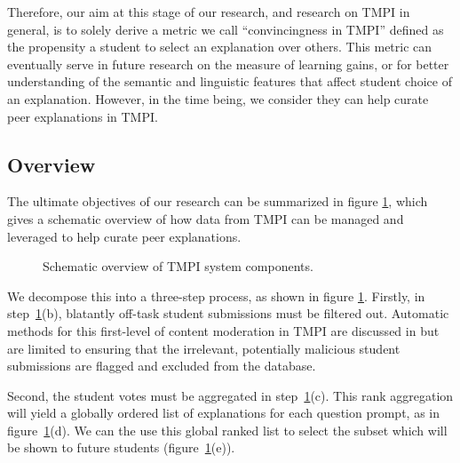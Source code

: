 \documentclass[notitlepage,12pt]{jedm}
\begin{document}
        Therefore, our aim at this stage of our research, and research on TMPI in general, is to solely derive a metric we call ``convincingness in TMPI'' defined as the propensity a student to select an explanation over others.  This metric can eventually serve in future research on the measure of learning gains, or for better understanding of the semantic and linguistic features that affect student choice of an explanation.  However, in the time being, we consider they can help curate peer explanations in TMPI.

\subsection{Overview}

The ultimate objectives of our research can be summarized in figure  
\ref{fig:tmpi_research}, which gives a schematic overview of how data from TMPI 
can be managed and leveraged to help curate peer explanations.
 
\begin{figure}[H]
	\centering
	\def\svgscale{0.70}
	
	\caption{
		Schematic overview of TMPI system components.
		 }
	\label{fig:tmpi_research}
\end{figure}

We decompose this into a three-step process, as shown in figure 
\ref{fig:tmpi_research}. 
Firstly, in step~\ref{fig:tmpi_research}(b), blatantly off-task 
student submissions must be filtered out. 
Automatic methods for this first-level of content moderation in TMPI are 
discussed in  but are limited to ensuring 
that the irrelevant, potentially malicious student submissions
are flagged and excluded from the database. 

Second, the student votes must be aggregated in step~\ref{fig:tmpi_research}(c).
This rank aggregation will yield a globally ordered list of explanations for 
each question prompt, as in figure~\ref{fig:tmpi_research}(d).
We can the use this global ranked list to select the subset which will be 
shown to future students (figure~\ref{fig:tmpi_research}(e)).
\end{document}
